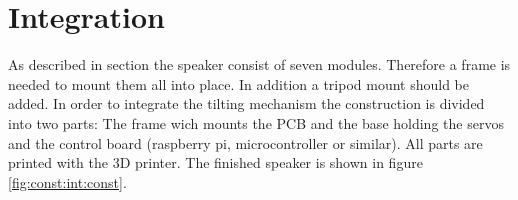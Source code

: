 \section{Integration}


As described in section  the speaker consist of seven modules. Therefore a frame is needed to mount them all into place. In addition a tripod mount should be added. In order to integrate the tilting mechanism the construction is divided into two parts: The frame wich mounts the PCB and the base holding the servos and the control board (raspberry pi, microcontroller or similar). All parts are printed with the 3D printer. The finished speaker is shown in figure \ref{fig:const:int:const}.
%
